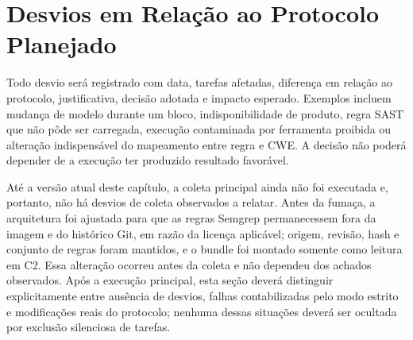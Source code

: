 \section{Desvios em Relação ao Protocolo Planejado}\label{sec:desvios-protocolo}

Todo desvio será registrado com data, tarefas afetadas, diferença em relação ao protocolo, justificativa, decisão adotada e impacto esperado. Exemplos incluem mudança de modelo durante um bloco, indisponibilidade de produto, regra SAST que não pôde ser carregada, execução contaminada por ferramenta proibida ou alteração indispensável do mapeamento entre regra e CWE. A decisão não poderá depender de a execução ter produzido resultado favorável.

Até a versão atual deste capítulo, a coleta principal ainda não foi executada e, portanto, não há desvios de coleta observados a relatar. Antes da fumaça, a arquitetura foi ajustada para que as regras Semgrep permanecessem fora da imagem e do histórico Git, em razão da licença aplicável; origem, revisão, hash e conjunto de regras foram mantidos, e o bundle foi montado somente como leitura em C2. Essa alteração ocorreu antes da coleta e não dependeu dos achados observados. Após a execução principal, esta seção deverá distinguir explicitamente entre ausência de desvios, falhas contabilizadas pelo modo estrito e modificações reais do protocolo; nenhuma dessas situações deverá ser ocultada por exclusão silenciosa de tarefas.
